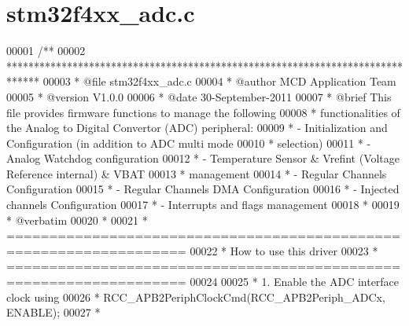\section{stm32f4xx\+\_\+adc.\+c}
\label{stm32f4xx__adc_8c_source}

\begin{DoxyCode}
00001 \textcolor{comment}{/**}
00002 \textcolor{comment}{  ******************************************************************************}
00003 \textcolor{comment}{  * @file    stm32f4xx\_adc.c}
00004 \textcolor{comment}{  * @author  MCD Application Team}
00005 \textcolor{comment}{  * @version V1.0.0}
00006 \textcolor{comment}{  * @date    30-September-2011}
00007 \textcolor{comment}{  * @brief   This file provides firmware functions to manage the following }
00008 \textcolor{comment}{  *          functionalities of the Analog to Digital Convertor (ADC) peripheral:}
00009 \textcolor{comment}{  *           - Initialization and Configuration (in addition to ADC multi mode }
00010 \textcolor{comment}{  *             selection)}
00011 \textcolor{comment}{  *           - Analog Watchdog configuration}
00012 \textcolor{comment}{  *           - Temperature Sensor & Vrefint (Voltage Reference internal) & VBAT}
00013 \textcolor{comment}{  *             management }
00014 \textcolor{comment}{  *           - Regular Channels Configuration}
00015 \textcolor{comment}{  *           - Regular Channels DMA Configuration}
00016 \textcolor{comment}{  *           - Injected channels Configuration}
00017 \textcolor{comment}{  *           - Interrupts and flags management}
00018 \textcolor{comment}{  *         }
00019 \textcolor{comment}{  *  @verbatim}
00020 \textcolor{comment}{  *}
00021 \textcolor{comment}{  *          ===================================================================}
00022 \textcolor{comment}{  *                                   How to use this driver}
00023 \textcolor{comment}{  *          ===================================================================}
00024 \textcolor{comment}{}
00025 \textcolor{comment}{  *          1.  Enable the ADC interface clock using }
00026 \textcolor{comment}{  *                  RCC\_APB2PeriphClockCmd(RCC\_APB2Periph\_ADCx, ENABLE); }
00027 \textcolor{comment}{  *     }

\end{DoxyCode}
